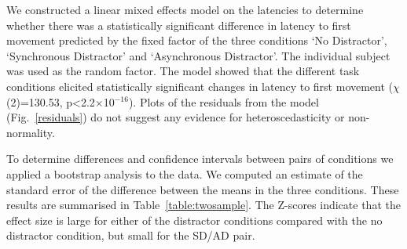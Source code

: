 \documentclass[10pt,letterpaper]{article}
\begin{document}
We constructed a linear mixed effects model on the latencies to
determine whether there was a statistically significant difference in
latency to first movement predicted by the fixed factor of the three
conditions `No Distractor', `Synchronous Distractor' and `Asynchronous
Distractor'. The individual subject was used as the random factor.
%
%
The model showed that the different task conditions elicited
statistically significant changes in latency to first movement
($\chi$(2)=130.53, p\textless2.2$\times$10$^{-16}$). Plots of the
residuals from the model (Fig.~\ref{residuals}) do not suggest any
evidence for heteroscedasticity or non-normality.

To determine differences and confidence intervals between pairs of
conditions we applied a bootstrap analysis to the data. We computed an
estimate of the standard error of the difference between the means in
the three conditions. These results are summarised in
Table~\ref{table:twosample}. The Z-scores indicate that the effect
size is large for either of the distractor conditions compared with
the no distractor condition, but small for the SD/AD pair.
\end{document}
